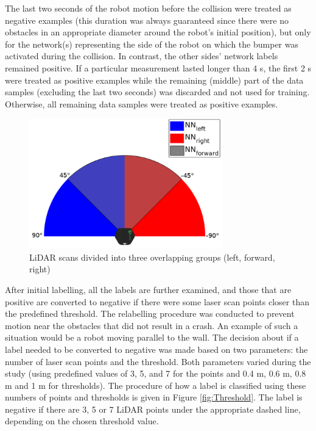 The last two seconds of the robot motion before the collision were treated as negative examples (this duration was always guaranteed since there were no obstacles in an appropriate diameter around the robot's initial position), but only for the network(s) representing the side of the robot on which the bumper was activated during the collision. In contrast, the other sides' network labels remained positive. If a particular measurement lasted longer than 4 s, the first 2 s were treated as positive examples while the remaining (middle) part of the data samples (excluding the last two seconds) was discarded and not used for training. Otherwise, all remaining data samples were treated as positive examples.

\begin{figure}
    \centering
    \includegraphics[width=0.75\textwidth]{slike/turkish/Fig03.pdf}
    \caption{LiDAR scans divided into three overlapping groups (left, forward, right)}
    \label{fig:Fig03}
\end{figure}

After initial labelling, all the labels are further examined, and those that are positive are converted to negative if there were some laser scan points closer than the predefined threshold. The relabelling procedure was conducted to prevent motion near the obstacles that did not result in a crash. An example of such a situation would be a robot moving parallel to the wall. The decision about if a label needed to be converted to negative was made based on two parameters: the number of laser scan points and the threshold. Both parameters varied during the study (using predefined values of 3, 5, and 7 for the points and 0.4 m, 0.6 m, 0.8 m and 1 m for thresholds). The procedure of how a label is classified using these numbers of points and thresholds is given in Figure \ref{fig:Threshold}. The label is negative if there are 3, 5 or 7 LiDAR points under the appropriate dashed line, depending on the chosen threshold value. 

